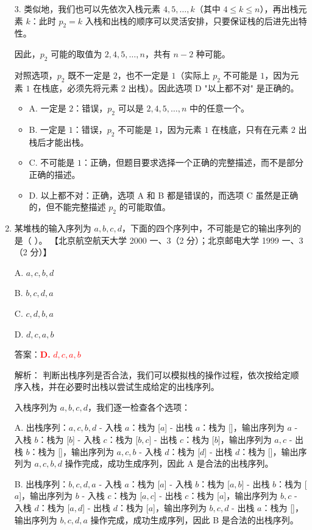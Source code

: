 \documentclass[lang=cn,newtx,10pt,scheme=chinese]{../../../elegantbook}
\begin{document}
\begin{enumerate}
    3. 类似地，我们也可以先依次入栈元素 $4, 5, \ldots, k$（其中 $4 \leq k \leq n$），再出栈元素 $k$：此时 $p_2 = k$
       入栈和出栈的顺序可以灵活安排，只要保证栈的后进先出特性。

    因此，$p_2$ 可能的取值为 $2, 4, 5, \ldots, n$，共有 $n-2$ 种可能。

    对照选项，$p_2$ 既不一定是 $2$，也不一定是 $1$（实际上 $p_2$ 不可能是 $1$，因为元素 $1$ 在栈底，必须先将元素 $2$ 出栈）。因此选项 D "以上都不对" 是正确的。

    \begin{itemize}
        \item A. 一定是 $2$：错误，$p_2$ 可以是 $2, 4, 5, \ldots, n$ 中的任意一个。
        \item B. 一定是 $1$：错误，$p_2$ 不可能是 $1$，因为元素 $1$ 在栈底，只有在元素 $2$ 出栈后才能出栈。
        \item C. 不可能是 $1$：正确，但题目要求选择一个正确的完整描述，而不是部分正确的描述。
        \item D. 以上都不对：正确，选项 A 和 B 都是错误的，而选项 C 虽然是正确的，但不能完整描述 $p_2$ 的可能取值。
    \end{itemize}

    \item 某堆栈的输入序列为 $a, b, c, d$，下面的四个序列中，不可能是它的输出序列的是（ ）。  
    【北京航空航天大学 2000 一、3（2 分）；北京邮电大学 1999 一、3（2 分）】  

    A. $a,c,b,d$  

    B. $b,c,d,a$  

    C. $c, d, b, a$  

    D. $d, c, a, b$  

    答案：\textcolor{red}{\textbf{D.} $d, c, a, b$}

    解析：
    判断出栈序列是否合法，我们可以模拟栈的操作过程，依次按给定顺序入栈，并在必要时出栈以尝试生成给定的出栈序列。

    入栈序列为 $a, b, c, d$，我们逐一检查各个选项：

    A. 出栈序列：$a,c,b,d$
       - 入栈 $a$：栈为 [$a$]
       - 出栈 $a$：栈为 []，输出序列为 $a$
       - 入栈 $b$：栈为 [$b$]
       - 入栈 $c$：栈为 [$b, c$]
       - 出栈 $c$：栈为 [$b$]，输出序列为 $a, c$
       - 出栈 $b$：栈为 []，输出序列为 $a, c, b$
       - 入栈 $d$：栈为 [$d$]
       - 出栈 $d$：栈为 []，输出序列为 $a, c, b, d$
       操作完成，成功生成序列，因此 A 是合法的出栈序列。

    B. 出栈序列：$b,c,d,a$
       - 入栈 $a$：栈为 [$a$]
       - 入栈 $b$：栈为 [$a, b$]
       - 出栈 $b$：栈为 [$a$]，输出序列为 $b$
       - 入栈 $c$：栈为 [$a, c$]
       - 出栈 $c$：栈为 [$a$]，输出序列为 $b, c$
       - 入栈 $d$：栈为 [$a, d$]
       - 出栈 $d$：栈为 [$a$]，输出序列为 $b, c, d$
       - 出栈 $a$：栈为 []，输出序列为 $b, c, d, a$
       操作完成，成功生成序列，因此 B 是合法的出栈序列。


\end{enumerate}
\end{document}
